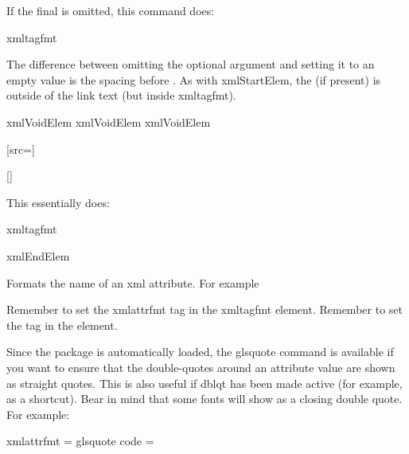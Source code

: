\documentclass[toc=listof]{scrreport}
\begin{document}
If the final  is omitted, this command does:
\begin{compactcodebox}
\gls{xmltagfmt}
\end{compactcodebox}
The difference between omitting the  optional
argument and setting it to an empty value is the spacing before
.
As with \gls{xmlStartElem}, the  (if present) is outside of the
link text (but inside \gls{xmltagfmt}).
\begin{coderesult}
\gls{xmlVoidElem}
\codepar
\gls{xmlVoidElem}
\codepar
\gls{xmlVoidElem}\oarg{}
\tcblower
{}

[src=]

[]
\end{coderesult}

This essentially does:
\begin{compactcodebox}
\gls{xmltagfmt}
\end{compactcodebox}
\begin{coderesult}
\gls{xmlEndElem}
\tcblower
{}
\end{coderesult}

Formats the name of an \gls{xml} attribute. For example
\begin{coderesult}
Remember to set the 
\gls{xmlattrfmt} tag
in the \gls{xmltagfmt} element.
\tcblower
Remember to set the 
 tag
in the  element.
\end{coderesult}
Since the  package is automatically loaded, the
\gls{glsquote} command is available if you want to ensure that
the double-quotes around an attribute value are shown as straight
quotes. This is also useful if \gls{dblqt} has been
made active (for example, as a  shortcut).
Bear in mind that some fonts will show  as a closing
double quote. For example:
\begin{coderesult}
\gls{xmlattrfmt} = 
\gls{glsquote}
\codepar
\gls{code}
\tcblower
{} = 

\end{coderesult}
\end{document}
